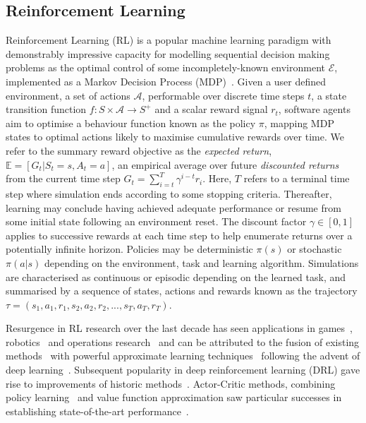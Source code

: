 \documentclass[conference,compsoc]{IEEEtran}
\begin{document}
\subsection{Reinforcement Learning}
Reinforcement Learning (RL) is a popular machine learning paradigm with demonstrably impressive capacity for modelling sequential decision making problems as the optimal control of some incompletely-known environment $\mathcal{E}$, implemented as a Markov Decision Process (MDP)~\cite{sutton2018reinforcement}. Given a user defined environment, a set of actions $\mathcal{A}$, performable over discrete time steps $t$, a state transition function $f : S \times \mathcal{A} \to S^{+}$ and a scalar reward signal $r_t$, software agents aim to optimise a behaviour function known as the policy $\pi$, mapping MDP states to optimal actions likely to maximise cumulative rewards over time. We refer to the summary reward objective as the \textit{expected return}, $\mathbb{E}=[G_t | S_t = s, A_t = a]$, an empirical average over future \textit{discounted returns} from the current time step $G_{t} = \sum_{i=t}^{T}\gamma^{i-t}r_{i}$. Here, $T$ refers to a terminal time step where simulation ends according to some stopping criteria. Thereafter, learning may conclude having achieved adequate performance or resume from some initial state following an environment reset. The discount factor $\gamma \in [0,1]$ applies to successive rewards at each time step to help enumerate returns over a potentially infinite horizon. Policies may be deterministic $\pi(s)$ or stochastic $\pi(a|s)$ depending on the environment, task and learning algorithm. Simulations are characterised as continuous or episodic depending on the learned task, and summarised by a sequence of states, actions and rewards known as the trajectory $\tau = (s_1, a_1, r_1,  s_2, a_2, r_2,...,s_T, a_T, r_T)$.

Resurgence in RL research over the last decade has seen applications in games~\cite{schaul2015prioritized, silver2016mastering, vinyals2019grandmaster}, robotics~\cite{gu2017deep, bloesch2022towards} and operations research~\cite{mazyavkina2021reinforcement} and can be attributed to the fusion of existing methods~\cite{watkins1992q} with powerful approximate learning techniques~\cite{lecun2015deep} following the advent of deep learning~\cite{mnih2013playing}. Subsequent popularity in deep reinforcement learning (DRL) gave rise to improvements of historic methods~\cite{schulman2017trust}. Actor-Critic methods, combining policy learning~\cite{kakade2001natural} and value function approximation saw particular successes in establishing state-of-the-art performance~\cite{schulman2017proximal}.
\end{document}
